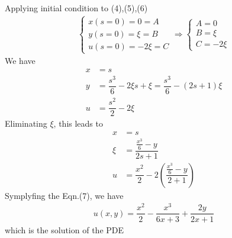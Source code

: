 \documentclass{article}
\newcommand{\f}[2]{\dfrac{#1}{#2}}
\begin{document}
Applying initial condition to (4),(5),(6)
\begin{align*}
	\begin{cases}
		x(s = 0) = 0 = A   \\
		y(s = 0) = \xi = B \\
		u(s = 0) = -2\xi = C
	\end{cases}
	\Rightarrow
	\begin{cases}
		A = 0   \\
		B = \xi \\
		C = -2\xi
	\end{cases}
\end{align*}
We have
\begin{align*}
	x & = s                           \\
	y & = \f{s^{3}}{6} - 2\xi s + \xi =  \f{s^{3}}{6} - (2s + 1) \xi \\
	u & = \f{s^{2}}{2} - 2\xi
\end{align*}
Eliminating $\xi$, this leads to
\begin{align*}
	x & = s                                             \\
	\xi & = \f{\frac{x^{3}}{6} - y}{2s + 1}                  \\
	u & = \f{x^{2}}{2} - 2 \left( \f{\frac{x^{3}}{6} - y}{2 + 1} \right) \tag{7}
\end{align*}
Symplyfing the Eqn.(7), we have
\begin{align*}
	u(x,y) = \f{x^{2}}{2} - \f{x^{3}}{6x + 3} + \f{2y}{2x + 1}
\end{align*}
which is the solution of the PDE
\end{document}
